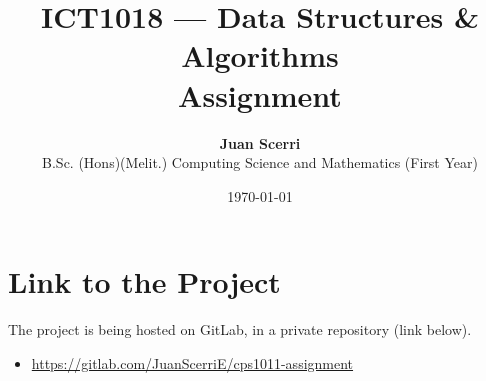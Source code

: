 \documentclass[12pt]{article}
\title{ICT1018 --- Data Structures \& Algorithms\\
\vspace{1em}\textbf{Assignment}}
\date{\today}
\author {{\textbf{Juan Scerri}}\\
B.Sc. (Hons)(Melit.) Computing Science and Mathematics (First Year)}
\begin{document}

\maketitle %

\thispagestyle{empty} %




\section{Link to the Project}

The project is being hosted on GitLab, in a private repository (link below). 

\begin{itemize}
\item \url{https://gitlab.com/JuanScerriE/cps1011-assignment}
\end{itemize}
\end{document}
